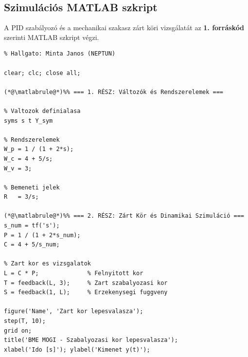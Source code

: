 \clearpage
\subsection{Szimulációs MATLAB szkript}
A PID szabályozó és a mechanikai szakasz zárt köri vizsgálatát az \textbf{1. forráskód} szerinti MATLAB szkript végzi.

\begin{matlabbox}
\begin{lstlisting}[style=matlabdark]
% Szabalyozastechnika - 2. szorgalmi feladat
% Hallgato: Minta Janos (NEPTUN)

clear; clc; close all;

(*@\matlabrule@*)%% === 1. RÉSZ: Változók és Rendszerelemek ===

% Valtozok definialasa
syms s t Y_sym

% Rendszerelemek
W_p = 1 / (1 + 2*s);
W_c = 4 + 5/s;
W_v = 3;

% Bemeneti jelek
R   = 3/s;

(*@\matlabrule@*)%% === 2. RÉSZ: Zárt Kör és Dinamikai Szimuláció ===
s_num = tf('s');
P = 1 / (1 + 2*s_num);
C = 4 + 5/s_num;

% Zart kor es vizsgalatok
L = C * P;              % Felnyitott kor
T = feedback(L, 3);     % Zart szabalyozasi kor
S = feedback(1, L);     % Erzekenysegi fuggveny

figure('Name', 'Zart kor lepesvalasza');
step(T, 10);
grid on;
title('BME MOGI - Szabalyozasi kor lepesvalasza');
xlabel('Ido [s]'); ylabel('Kimenet y(t)');
\end{lstlisting}
\end{matlabbox}
